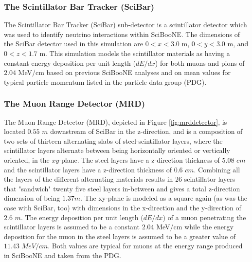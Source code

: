 \documentclass[11pt]{article}
\begin{document}
\subsubsection{The Scintillator Bar Tracker (SciBar)} \label{subsubsec:SciBar}
The Scintillator Bar Tracker (SciBar) sub-detector is a scintillator detector which was used to identify neutrino interactions within SciBooNE. The dimensions of the SciBar detector used in this simulation are $0 < x < 3.0$ m, $0 < y < 3.0$ m, and $0 < z < 1.7$ m. This simulation models the scintillator materials as having a constant energy deposition per unit length ($dE/dx$) for both muons and pions of $2.04$ MeV/cm based on previous SciBooNE analyses and on mean values for typical particle momentum listed in the particle data group (PDG).

\subsubsection{The Muon Range Detector (MRD)}\label{subsubsec:MRD}
The Muon Range Detector (MRD), depicted in Figure \ref*{fig:mrddetector}, is located $0.55$ $m$ downstream of SciBar in the z-direction, and is a composition of two sets of thirteen alternating slabs of steel-scintillator layers, where the scintillator layers alternate between being horizontally oriented or vertically oriented, in the $xy$-plane. The steel layers have a z-direction thickness of $5.08$ $cm$ and the scintillator layers have a z-direction thickness of $0.6$ $cm$. Combining all the layers of the different alternating materials results in 26 scintillator layers that "sandwich" twenty five steel layers in-between and gives a total z-direction dimension of being $1.37 m$. The xy-plane is modeled as a square again (as was the case with SciBar, too) with dimensions in the x-direction and the y-direction of $2.6$ $m$. The energy deposition per unit length ($dE/dx$) of a muon penetrating the scintillator layers is assumed to be a constant $2.04$ MeV/cm while the energy deposition for the muon in the steel layers is assumed to be a greater value of $11.43$ $MeV/cm$. Both values are typical for muons at the energy range produced in SciBooNE and taken from the PDG.
\end{document}

